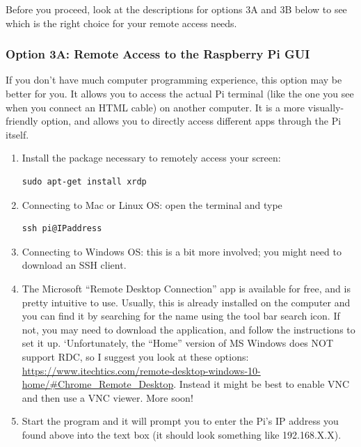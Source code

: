 \documentclass{article}\usepackage[]{graphicx}\usepackage[]{color}
\begin{document}
Before you proceed, look at the descriptions for options 3A and 3B below to see which is the right choice for your remote access needs.

\subsubsection{Option 3A: Remote Access to the Raspberry Pi GUI}

If you don't have much computer programming experience, this option may be better for you.  It allows you to access the actual Pi terminal (like the one you see when you connect an HTML cable) on another computer.  It is a more visually-friendly option, and allows you to directly access different apps through the Pi itself.

\begin{enumerate}

\item Install the package necessary to remotely access your screen: 

\begin{lstlisting}
sudo apt-get install xrdp
\end{lstlisting}

\item Connecting to Mac or Linux OS: open the terminal and type

\begin{lstlisting}
ssh pi@IPaddress
\end{lstlisting}

\item Connecting to Windows OS: this is a bit more involved; you might need to download an SSH client. 

\item The Microsoft ``Remote Desktop Connection'' app is available for free, and is pretty intuitive to use. Usually, this is already installed on the computer and you can find it by searching for the name using the tool bar search icon. If not, you may need to download the application, and follow the instructions to set it up. `Unfortunately, the ``Home'' version of MS Windows does NOT support RDC, so I suggest you look at these options: \url{https://www.itechtics.com/remote-desktop-windows-10-home/#Chrome_Remote_Desktop}. Instead it might be best to enable VNC and then use a VNC viewer. More soon!

\item Start the program and it will prompt you to enter the Pi's IP  address you found above into the text box (it should look something like 192.168.X.X).


\end{enumerate}
\end{document}
